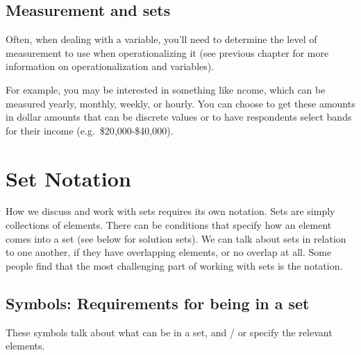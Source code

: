 \documentclass[
]{book}
\begin{document}
\hypertarget{measurement-and-sets}{%
\subsection{Measurement and sets}\label{measurement-and-sets}}

Often, when dealing with a variable, you'll need to determine the level of measurement to use when operationalizing it (see previous chapter for more information on operationalization and variables).

For example, you may be interested in something like ncome, which can be measured yearly, monthly, weekly, or hourly. You can choose to get these amounts in dollar amounts that can be discrete values or to have respondents select bands for their income (e.g.~\$20,000-\$40,000).

\hypertarget{set-notation}{%
\section{Set Notation}\label{set-notation}}

How we discuss and work with sets requires its own notation. Sets are simply collections of elements. There can be conditions that specify how an element comes into a set (see below for solution sets). We can talk about sets in relation to one another, if they have overlapping elements, or no overlap at all. Some people find that the most challenging part of working with sets is the notation.

\hypertarget{symbols-requirements-for-being-in-a-set}{%
\subsection{Symbols: Requirements for being in a set}\label{symbols-requirements-for-being-in-a-set}}

These symbols talk about what can be in a set, and / or specify the relevant elements.
\end{document}

